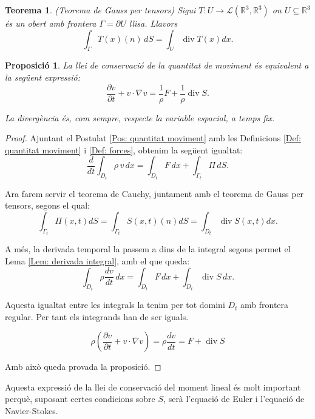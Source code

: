 \documentclass{article}
\numberwithin{equation}{section}
\DeclareMathOperator{\diver}{div}
\newtheorem{teorema}{Teorema}[section]
\newtheorem{proposicio}{Proposici\'{o}}[section]
\begin{document}
\begin{teorema}
(Teorema de Gauss per tensors) Sigui $T:U\rightarrow\mathcal{L}(\mathbb{R}^3,\mathbb{R}^3)$ on $U\subseteq\mathbb{R}^3$ \'{e}s un obert amb frontera $\Gamma=\partial U$ llisa. Llavors
\begin{equation}
\int_{\Gamma}T(x)(n)\,dS=\int_U\diver T(x)dx.
\end{equation}
\end{teorema}

\begin{proposicio}\label{Pro: conservacio moment}
La llei de conservaci\'{o} de la quantitat de moviment \'{e}s equivalent a la seg\"{u}ent expressi\'{o}:
\begin{equation}\label{Equ. conservacio moment}
\frac{\partial v}{\partial t}+v\cdot\nabla v=\frac{1}{\rho}F+\frac{1}{\rho}\diver S.
\end{equation}

La diverg\`{e}ncia \'{e}s, com sempre, respecte la variable espacial, a temps fix.
\end{proposicio}
\begin{proof}
Ajuntant el Postulat \ref{Pos: quantitat moviment} amb les Definicions \ref{Def: quantitat moviment} i \ref{Def: forces}, obtenim la seg\"{u}ent igualtat:
\[\frac{d}{dt}\int_{D_t}\rho\,v\,dx=\int_{D_t}F\,dx+\int_{\Gamma_t}\Pi\,dS.\]

Ara farem servir el teorema de Cauchy, juntament amb el teorema de Gauss per tensors, segons el qual:
\[\int_{\Gamma_t}\Pi(x,t)dS=\int_{\Gamma_t}S(x,t)(n)dS=\int_{D_t}\diver S(x,t)dx.\]

A m\'{e}s, la derivada temporal la passem a dins de la integral segons permet el Lema \ref{Lem: derivada integral}, amb el que queda:
\[\int_{D_t}\rho\frac{dv}{dt}\,dx=\int_{D_t}F\,dx+\int_{D_t}\diver S\,dx.\]

Aquesta igualtat entre les integrals la tenim per tot domini $D_t$ amb frontera regular. Per tant els integrands han de ser iguals.

\[\rho\left(\frac{\partial v}{\partial t}+v\cdot\nabla v\right)=\rho\frac{dv}{dt}=F+\diver S\]

Amb aix\`{o} queda provada la proposici\'{o}.
\end{proof}

Aquesta expressi\'{o} de la llei de conservaci\'{o} del moment lineal \'{e}s molt important perqu\`{e}, suposant certes condicions sobre $S$, ser\`{a} l'equaci\'{o} de Euler i l'equaci\'{o} de Navier-Stokes.
\end{document}
